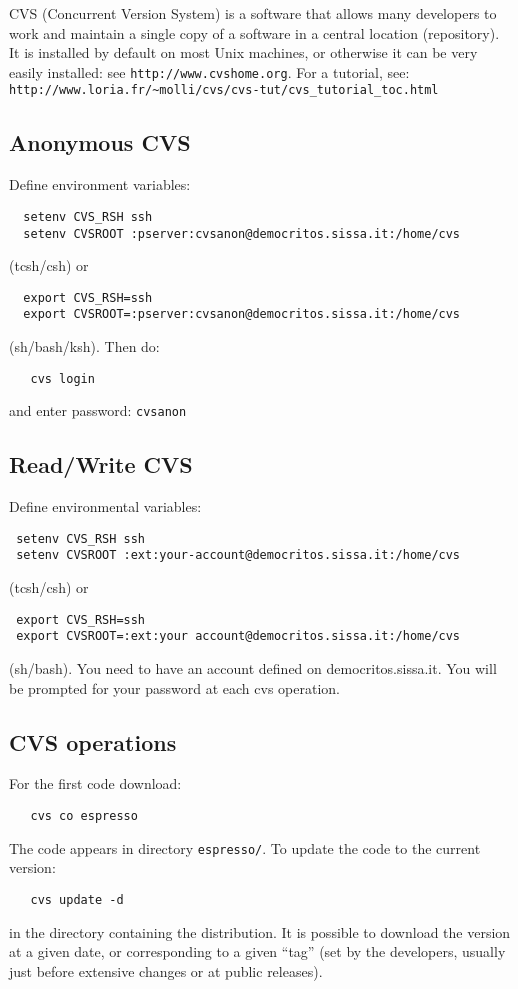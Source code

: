 \documentclass[12pt,a4paper]{article}
\begin{document}
CVS (Concurrent Version System) is a software that allows many
developers to work and maintain a single copy of a software in
a central location (repository). It is installed by default on
most Unix machines, or otherwise it can be very easily installed:
see {\tt http://www.cvshome.org}. For a tutorial, see:\\
{\tt http://www.loria.fr/\~{}molli/cvs/cvs-tut/cvs\_tutorial\_toc.html}

\subsection{Anonymous CVS}

Define environment variables:
\begin{verbatim}
  setenv CVS_RSH ssh
  setenv CVSROOT :pserver:cvsanon@democritos.sissa.it:/home/cvs
\end{verbatim}
(tcsh/csh) or
\begin{verbatim}
  export CVS_RSH=ssh
  export CVSROOT=:pserver:cvsanon@democritos.sissa.it:/home/cvs
\end{verbatim}
(sh/bash/ksh). Then do:
\begin{verbatim}
   cvs login
\end{verbatim}
and enter password: \texttt{cvsanon}

\subsection{Read/Write CVS}

Define environmental variables:
\begin{verbatim}
 setenv CVS_RSH ssh
 setenv CVSROOT :ext:your-account@democritos.sissa.it:/home/cvs
\end{verbatim}
(tcsh/csh) or
\begin{verbatim}
 export CVS_RSH=ssh
 export CVSROOT=:ext:your account@democritos.sissa.it:/home/cvs
\end{verbatim}
(sh/bash). You need to have an account defined on democritos.sissa.it.
You will be prompted for your password at each cvs operation.

\subsection{CVS operations}

For the first code download:
\begin{verbatim}
   cvs co espresso
\end{verbatim}
The code appears in directory \texttt{espresso/}.
To update the code to the current version:
\begin{verbatim}
   cvs update -d
\end{verbatim}
in the directory containing the distribution. It is possible 
to download the version at a given date, or corresponding to 
a given ``tag'' (set by the developers, usually just before 
extensive changes or at public releases).
\end{document}
